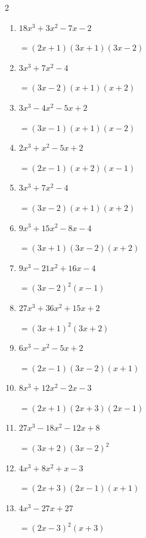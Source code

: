 \begin{multicols}{2}
\begin{enumerate}
        $=(2x-1)(x-2)(x-3)$

  \item $18x^{3}+3x^{2}-7x-2$

        $=(2x+1)(3x+1)(3x-2)$

\columnbreak %

  \item $3x^{3}+7x^{2}-4$

        $=(3x-2)(x+1)(x+2)$

  \item $3x^{3}-4x^{2}-5x+2$

        $=(3x-1)(x+1)(x-2)$

  \item $2x^{3}+x^{2}-5x+2$

        $=(2x-1)(x+2)(x-1)$

  \item $3x^{3}+7x^{2}-4$

        $=(3x-2)(x+1)(x+2)$

  \item $9x^{3}+15x^{2}-8x-4$

        $=(3x+1)(3x-2)(x+2)$

\columnbreak %

\resetques

  \item $9x^{3}-21x^{2}+16x-4$

        $=(3x-2) ^{ 2 }(x-1)$

  \item $27x^{3}+36x^{2}+15x+2$

        $=(3x+1) ^{ 2 }(3x+2)$

  \item $6x^{3}-x^{2}-5x+2$

        $=(2x-1)(3x-2)(x+1)$

  \item $8x^{3}+12x^{2}-2x-3$

        $=(2x+1)(2x+3)(2x-1)$

  \item $27x^{3}-18x^{2}-12x+8$

        $=(3x+2)(3x-2) ^{ 2 }$

\columnbreak %

  \item $4x^{3}+8x^{2}+x-3$

        $=(2x+3)(2x-1)(x+1)$

  \item $4x^{3}-27x+27$

        $=(2x-3) ^{ 2 }(x+3)$


\end{enumerate}
\end{multicols}
